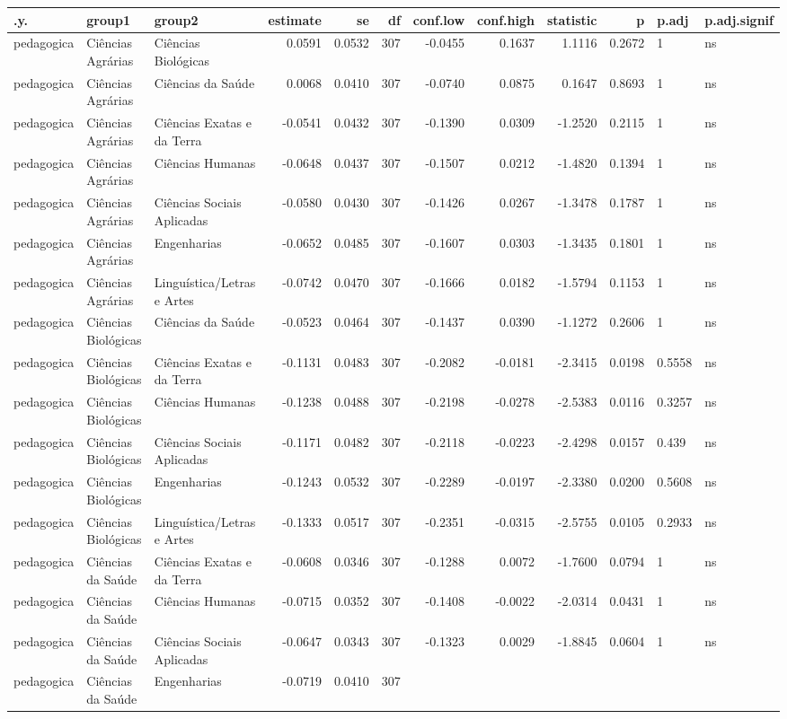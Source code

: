\documentclass[]{article}
\begin{document}
\begin{longtable}[]{@{}lllrrrrrrrll@{}}
\toprule
.y. & group1 & group2 & estimate & se & df & conf.low & conf.high &
statistic & p & p.adj & p.adj.signif\tabularnewline
\midrule
\endhead
pedagogica & Ciências Agrárias & Ciências Biológicas & 0.0591 & 0.0532 &
307 & -0.0455 & 0.1637 & 1.1116 & 0.2672 & 1 & ns\tabularnewline
pedagogica & Ciências Agrárias & Ciências da Saúde & 0.0068 & 0.0410 &
307 & -0.0740 & 0.0875 & 0.1647 & 0.8693 & 1 & ns\tabularnewline
pedagogica & Ciências Agrárias & Ciências Exatas e da Terra & -0.0541 &
0.0432 & 307 & -0.1390 & 0.0309 & -1.2520 & 0.2115 & 1 &
ns\tabularnewline
pedagogica & Ciências Agrárias & Ciências Humanas & -0.0648 & 0.0437 &
307 & -0.1507 & 0.0212 & -1.4820 & 0.1394 & 1 & ns\tabularnewline
pedagogica & Ciências Agrárias & Ciências Sociais Aplicadas & -0.0580 &
0.0430 & 307 & -0.1426 & 0.0267 & -1.3478 & 0.1787 & 1 &
ns\tabularnewline
pedagogica & Ciências Agrárias & Engenharias & -0.0652 & 0.0485 & 307 &
-0.1607 & 0.0303 & -1.3435 & 0.1801 & 1 & ns\tabularnewline
pedagogica & Ciências Agrárias & Linguística/Letras e Artes & -0.0742 &
0.0470 & 307 & -0.1666 & 0.0182 & -1.5794 & 0.1153 & 1 &
ns\tabularnewline
pedagogica & Ciências Biológicas & Ciências da Saúde & -0.0523 & 0.0464
& 307 & -0.1437 & 0.0390 & -1.1272 & 0.2606 & 1 & ns\tabularnewline
pedagogica & Ciências Biológicas & Ciências Exatas e da Terra & -0.1131
& 0.0483 & 307 & -0.2082 & -0.0181 & -2.3415 & 0.0198 & 0.5558 &
ns\tabularnewline
pedagogica & Ciências Biológicas & Ciências Humanas & -0.1238 & 0.0488 &
307 & -0.2198 & -0.0278 & -2.5383 & 0.0116 & 0.3257 & ns\tabularnewline
pedagogica & Ciências Biológicas & Ciências Sociais Aplicadas & -0.1171
& 0.0482 & 307 & -0.2118 & -0.0223 & -2.4298 & 0.0157 & 0.439 &
ns\tabularnewline
pedagogica & Ciências Biológicas & Engenharias & -0.1243 & 0.0532 & 307
& -0.2289 & -0.0197 & -2.3380 & 0.0200 & 0.5608 & ns\tabularnewline
pedagogica & Ciências Biológicas & Linguística/Letras e Artes & -0.1333
& 0.0517 & 307 & -0.2351 & -0.0315 & -2.5755 & 0.0105 & 0.2933 &
ns\tabularnewline
pedagogica & Ciências da Saúde & Ciências Exatas e da Terra & -0.0608 &
0.0346 & 307 & -0.1288 & 0.0072 & -1.7600 & 0.0794 & 1 &
ns\tabularnewline
pedagogica & Ciências da Saúde & Ciências Humanas & -0.0715 & 0.0352 &
307 & -0.1408 & -0.0022 & -2.0314 & 0.0431 & 1 & ns\tabularnewline
pedagogica & Ciências da Saúde & Ciências Sociais Aplicadas & -0.0647 &
0.0343 & 307 & -0.1323 & 0.0029 & -1.8845 & 0.0604 & 1 &
ns\tabularnewline
pedagogica & Ciências da Saúde & Engenharias & -0.0719 & 0.0410 & 307 &

\end{longtable}
\end{document}
